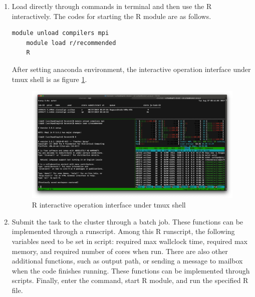 \documentclass[a4paper,12pt,titlepage]{article} %
\numberwithin{equation}{section}  %
\begin{document}
	\begin{enumerate}

	\item Load directly through commands in terminal and then use the R interactively. The codes for starting the R module are as follows.
	
	
	\begin{lstlisting}[language=sh]
	module unload compilers mpi
	module load r/recommended
	R
	\end{lstlisting}
	
	After setting anaconda environment, the interactive operation interface under tmux shell is as figure \ref{fig:R_cluster}.
	
	\begin{figure}[h]    %
	\centering           %
	\includegraphics[width=14.5cm, angle=0]{R_cluster.png} %
	\vspace*{-0.25cm}    %
	\caption{R interactive operation interface under tmux shell}          %
	\label{fig:R_cluster}               %
	\end{figure}                        %
	
	
	\item Submit the task to the cluster through a batch job. These functions can be implemented through a runscript. Among this R runscript, the following variables need to be set in script:  required max wallclock time, required max memory, and required number of cores when run. There are also other additional functions, such as output path, or sending a message to mailbox when the code finishes running. These functions can be implemented through scripts. Finally, enter the command, start R module, and run the specified R file.
	

\end{enumerate}
\end{document}
